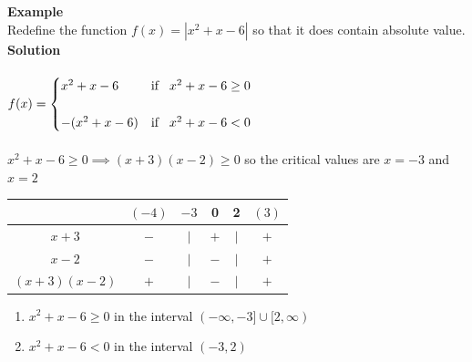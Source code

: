 \documentclass[11pt,a4paper]{article}
\begin{document}
\begin{figure}[h!]
\centering
{}
\end{figure}


\vspace{0.5cm}

\textbf{Example}\\
Redefine the function $f(x)=|x^2+x-6|$ so that it does contain absolute value.\\

\textbf{Solution}\\\\
$f(x)=
\begin{cases}
x^2+x-6 & \text{if}\hspace{0.3cm} x^2+x-6\geq 0\\\\
-(x^2+x-6) & \text{if}\hspace{0.3cm} x^2+x-6<0\\
\end{cases}
$\\\\

$x^2+x-6\geq 0\implies (x+3)(x-2)\geq  0$ so the critical values are $x=-3$ and $x=2$



\begin{table}[H]
\centering
\begin{tabular}{cccccc}
&$(-4)$&$-3$&0&2&$(3)$\\
\hline
\multicolumn{1}{c|}{$x+3$} & $-$ & $|$ & $+$ & $|$ & $+$\\
\multicolumn{1}{c|}{$x-2$} & $-$ & $|$ & $-$ & $|$ & $+$\\
\multicolumn{1}{c}{$(x+3)(x-2)$} & $+$ & $|$ & $-$ & $|$ & $+$\\
\end{tabular}
\end{table}


\begin{enumerate}
\item[$\bullet$] $x^2+x-6\geq 0$ in the interval $(-\infty,-3]\cup [2,\infty)$
\item[$\bullet$] $x^2+x-6<0$ in the interval $(-3,2)$\\
\end{enumerate}
\end{document}

